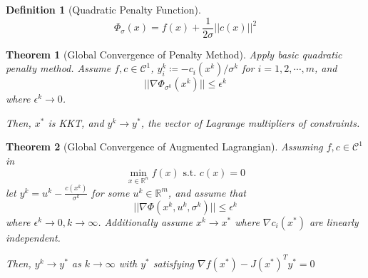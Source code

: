 \documentclass[a4paper]{article}
\newcommand{\R}{\mathbb{R}}
\newcommand{\C}{\mathcal{C}}
\newcommand{\st}{\text{ s.t. }}
\newcommand{\norm}[1]{\lvert \lvert #1 \rvert \rvert}
\newtheorem{theorem}{Theorem}
\newtheorem*{definition*}{Definition}
\begin{document}
\begin{definition*}[Quadratic Penalty Function]
    \begin{equation*}
        \Phi_\sigma (x) = f(x) + \frac{1}{2\sigma} \norm{c(x)}^2
    \end{equation*}
\end{definition*}

\setcounter{theorem}{20}
\begin{theorem}[Global Convergence of Penalty Method]
    Apply basic quadratic penalty method.
    Assume $f,c \in \C^1$, $y_i^k \coloneqq -c_i \left( x^k \right) / \sigma^k$ for $i = 1, 2, \cdots, m$, and
    \begin{equation*}
        \norm{\nabla \Phi_{\sigma^k} \left( x^k \right)} \leq \epsilon^k
    \end{equation*}
    where $\epsilon^k \rightarrow 0$.

    Then,
    $x^*$ is KKT, and $y^k \rightarrow y^*$, the vector of Lagrange multipliers of constraints.
\end{theorem}

\begin{theorem}[Global Convergence of Augmented Lagrangian]
    Assuming $f,c \in \C^1$ in \begin{equation*}
        \min_{x\in\R^n} f(x) \st c(x) = 0
    \end{equation*}
    let $y^k = u^k - \frac{c\left( x^k \right)}{\sigma^k}$
    for some $u^k \in \R^m$,
    and assume that
    \begin{equation*}
        \norm{\nabla \Phi \left( x^k, u^k, \sigma^k \right)} \leq \epsilon^k
    \end{equation*}
    where $\epsilon^k \rightarrow 0, k \rightarrow \infty$.
    Additionally assume $x^k \rightarrow x^*$ where $\nabla c_i \left( x^* \right)$ are linearly independent.

    Then, $y^k \rightarrow y^*$ as $k \rightarrow \infty$ with $y^*$ satisfying $\nabla f\left( x^* \right) - J \left( x^* \right)^T y^* = 0$
\end{theorem}
\end{document}
